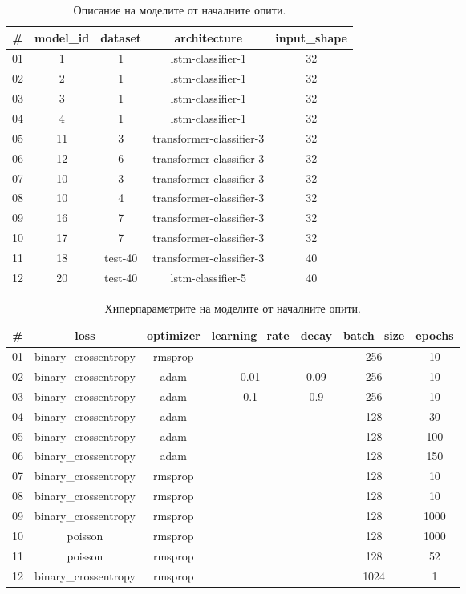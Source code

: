 \documentclass{article}
\begin{document}
\begin{table}[H]
\centering
\captionsetup{justification=centering}
\begin{tabular}{|c||c|c|c|c|}
\hline
\# & model\_id & dataset & architecture & input\_shape\\
\hline
01 & 1 & 1 & lstm-classifier-1 & 32\\
02 & 2 & 1 & lstm-classifier-1 & 32\\
03 & 3 & 1 & lstm-classifier-1 & 32\\
04 & 4 & 1 & lstm-classifier-1 & 32\\
05 & 11 & 3 & transformer-classifier-3 & 32\\
06 & 12 & 6 & transformer-classifier-3 & 32\\
07 & 10 & 3 & transformer-classifier-3 & 32\\
08 & 10 & 4 & transformer-classifier-3 & 32\\
09 & 16 & 7 & transformer-classifier-3 & 32\\
10 & 17 & 7 & transformer-classifier-3 & 32\\
11 & 18 & test-40 & transformer-classifier-3 & 40\\
12 & 20 & test-40 & lstm-classifier-5 & 40\\
\hline
\end{tabular}
\caption{Описание на моделите от началните опити.}
\end{table}

\begin{table}[H]
\centering
\captionsetup{justification=centering}
\begin{tabular}{|c||c|c|c|c|c|c|}
\hline
\# & loss & optimizer & learning\_rate & decay & batch\_size & epochs\\
\hline
01 & binary\_crossentropy & rmsprop &  & & 256 & 10\\
02 & binary\_crossentropy & adam & 0.01 & 0.09 & 256 & 10\\
03 & binary\_crossentropy & adam & 0.1 & 0.9 & 256 & 10\\
04 & binary\_crossentropy & adam &  & & 128 & 30\\
05 & binary\_crossentropy & adam &  & & 128 & 100\\
06 & binary\_crossentropy & adam &  & & 128 & 150\\
07 & binary\_crossentropy & rmsprop &  & & 128 & 10\\
08 & binary\_crossentropy & rmsprop &  & & 128 & 10\\
09 & binary\_crossentropy & rmsprop &  & & 128 & 1000\\
10 & poisson & rmsprop &  & & 128 & 1000\\
11 & poisson & rmsprop &  & & 128 & 52\\
12 & binary\_crossentropy & rmsprop &  & & 1024 & 1\\
\hline
\end{tabular}
\caption{Хиперпараметрите на моделите от началните опити.}
\end{table}
\end{document}

